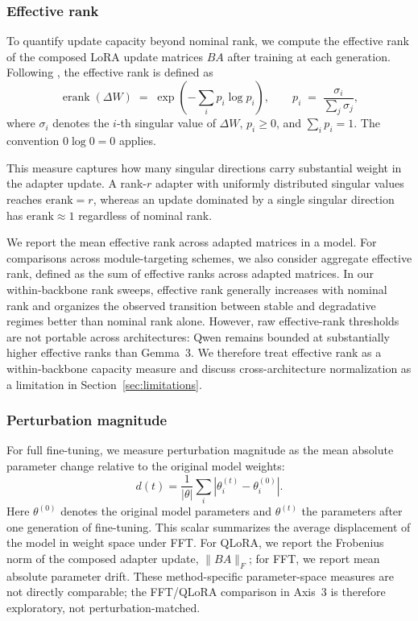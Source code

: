 \documentclass[a4paper,fleqn]{cas-dc}
\newif\ifshowchanges
\newcommand{\rev}[1]{\ifshowchanges{\color{blue}#1}\else{#1}\fi}
\begin{document}
\subsubsection{Effective rank}\label{sec:erank}
To quantify update capacity beyond nominal rank, we compute the effective rank
of the composed LoRA update matrices $BA$ after training at each generation.
Following \citet{roy2007}, the effective rank is defined as
\begin{equation}\label{eq:erank}
    \operatorname{erank}(\Delta W)
    \;=\;
    \exp\!\left(-\sum_{i} p_i \log p_i\right),
    \qquad
    p_i \;=\; \frac{\sigma_i}{\sum_{j} \sigma_j},
\end{equation}
\rev{where $\sigma_i$ denotes the $i$-th singular value of $\Delta W$,
$p_i \ge 0$, and $\sum_i p_i = 1$. The convention $0 \log 0 = 0$ applies.}

\rev{This measure captures how many singular directions carry
substantial weight in the adapter update. A rank-$r$ adapter with uniformly
distributed singular values reaches $\mathrm{erank}=r$, whereas an update
dominated by a single singular direction has $\mathrm{erank}\approx 1$ regardless
of nominal rank.}

We report the mean effective rank across adapted
matrices in a model. For comparisons across module-targeting schemes, we also
consider aggregate effective rank, defined as the sum of effective ranks across
adapted matrices. In our within-backbone rank sweeps, effective rank generally
increases with nominal rank and organizes the observed transition between
stable and degradative regimes better than nominal rank alone. However,
raw effective-rank thresholds are not portable across architectures: Qwen
remains bounded at substantially higher effective ranks than Gemma~3. We
therefore treat effective rank as a within-backbone capacity measure and discuss
cross-architecture normalization as a limitation in Section~\ref{sec:limitations}.

\subsubsection{Perturbation magnitude}\label{sec:pertmag}
For full fine-tuning, we measure perturbation magnitude as the mean absolute
parameter change relative to the original model weights:
\begin{equation}\label{eq:drift}
    \rev{d(t)} =
    \frac{1}{|\theta|}\sum_i |\theta^{(t)}_i - \theta^{(0)}_i|.
\end{equation}
Here $\theta^{(0)}$ denotes the original model parameters and $\theta^{(t)}$
the parameters after one generation of fine-tuning.
This scalar summarizes the
average displacement of the model in weight space under FFT. For QLoRA, we report the Frobenius norm of the composed adapter
update, $\|BA\|_F$; for FFT, we report mean absolute parameter drift.
These method-specific parameter-space measures are not directly
comparable; the FFT/QLoRA comparison in Axis~3 is therefore exploratory, not perturbation-matched.
\end{document}
